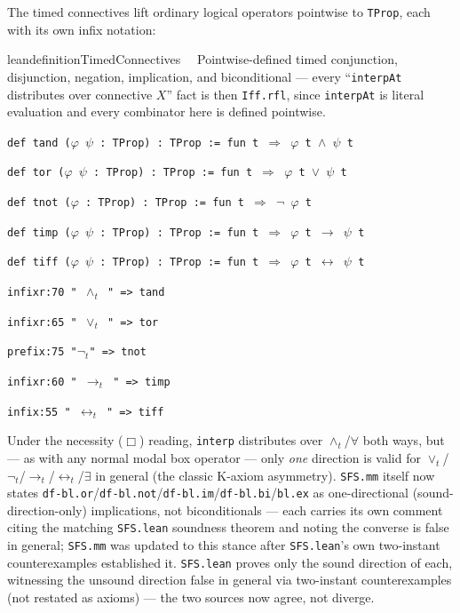 \pn The timed connectives lift ordinary logical operators pointwise to \texttt{TProp}, each with its own infix notation:

\begin{restatable}{leandefinition}{TimedConnectives}~~ Pointwise-defined timed conjunction, disjunction, negation, implication, and biconditional --- every ``\texttt{interpAt} distributes over connective $X$'' fact is then \texttt{Iff.rfl}, since \texttt{interpAt} is literal evaluation and every combinator here is defined pointwise.

\texttt{\textcolor{leancolor}{def} \textcolor{leanyellow}{tand} ($\varphi$ $\psi$ : TProp) : TProp := \textcolor{leancolor}{fun} t $\Rightarrow$ $\varphi$ t $\wedge$ $\psi$ t}

\texttt{\textcolor{leancolor}{def} \textcolor{leanyellow}{tor} ($\varphi$ $\psi$ : TProp) : TProp := \textcolor{leancolor}{fun} t $\Rightarrow$ $\varphi$ t $\vee$ $\psi$ t}

\texttt{\textcolor{leancolor}{def} \textcolor{leanyellow}{tnot} ($\varphi$ : TProp) : TProp := \textcolor{leancolor}{fun} t $\Rightarrow$ $\neg$ $\varphi$ t}

\texttt{\textcolor{leancolor}{def} \textcolor{leanyellow}{timp} ($\varphi$ $\psi$ : TProp) : TProp := \textcolor{leancolor}{fun} t $\Rightarrow$ $\varphi$ t $\to$ $\psi$ t}

\texttt{\textcolor{leancolor}{def} \textcolor{leanyellow}{tiff} ($\varphi$ $\psi$ : TProp) : TProp := \textcolor{leancolor}{fun} t $\Rightarrow$ $\varphi$ t $\leftrightarrow$ $\psi$ t}

\texttt{\textcolor{leancolor}{infixr:70} " $\wedge_t$ " => tand}

\texttt{\textcolor{leancolor}{infixr:65} " $\vee_t$ " => tor}

\texttt{\textcolor{leancolor}{prefix:75} "$\neg_t$" => tnot}

\texttt{\textcolor{leancolor}{infixr:60} " $\to_t$ " => timp}

\texttt{\textcolor{leancolor}{infix:55} " $\leftrightarrow_t$ " => tiff}
\label{tand}
\label{tor}
\label{tnot}
\label{timp}
\label{tiff}
\end{restatable}

\pn Under the necessity ($\Box$) reading, \texttt{interp} distributes over $\wedge_t$/$\forall$ both ways, but --- as with any normal modal box operator --- only \emph{one} direction is valid for $\vee_t$/$\neg_t$/$\to_t$/$\leftrightarrow_t$/$\exists$ in general (the classic K-axiom asymmetry). \texttt{SFS.mm} itself now states \texttt{df-bl.or}/\texttt{df-bl.not}/\texttt{df-bl.im}/\texttt{df-bl.bi}/\texttt{bl.ex} as one-directional (sound-direction-only) implications, not biconditionals --- each carries its own comment citing the matching \texttt{SFS.lean} soundness theorem and noting the converse is false in general; \texttt{SFS.mm} was updated to this stance after \texttt{SFS.lean}'s own two-instant counterexamples established it. \texttt{SFS.lean} proves only the sound direction of each, witnessing the unsound direction false in general via two-instant counterexamples (not restated as axioms) --- the two sources now agree, not diverge.

